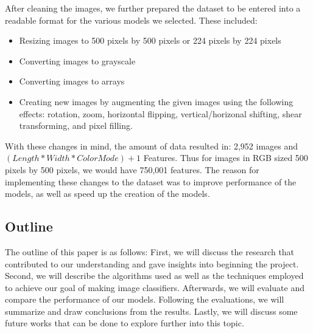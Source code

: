 After cleaning the images, we further prepared the dataset to be entered into a readable format for the various models we selected. These included:
\begin{itemize}
    \item Resizing images to 500 pixels by 500 pixels or 224 pixels by 224 pixels
    \item Converting images to grayscale
    \item Converting images to arrays
    \item Creating new images by augmenting the given images using the following effects: rotation, zoom, horizontal flipping, vertical/horizonal shifting, shear transforming, and pixel filling.
\end{itemize}

With these changes in mind, the amount of data resulted in: 2,952 images and $(Length * Width * Color Mode) + 1$ Features. 
Thus for images in RGB sized 500 pixels by 500 pixels, we would have 750,001 features.
The reason for implementing these changes to the dataset was to improve performance of the models, as well as speed up the creation of the models.

\subsection{Outline}
The outline of this paper is as follows: First, we will discuss the research that contributed to our understanding and gave insights into beginning the project.
Second, we will describe the algorithms used as well as the techniques employed to achieve our goal of making image classifiers.
Afterwards, we will evaluate and compare the performance of our models.
Following the evaluations, we will summarize and draw conclusions from the results.
Lastly, we will discuss some future works that can be done to explore further into this topic.
